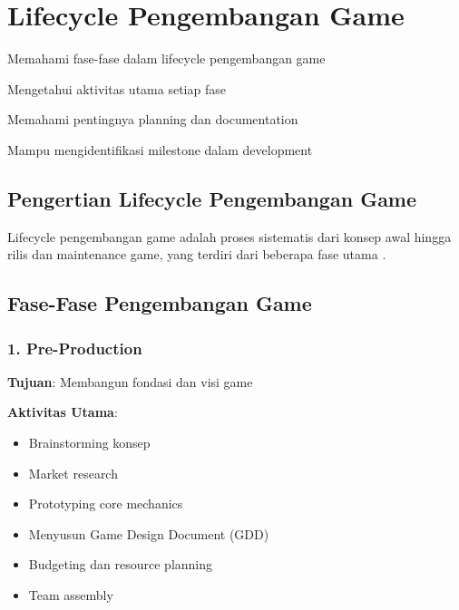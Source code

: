 
\section{Lifecycle Pengembangan Game}

\begin{learningoutcomes}
\item Memahami fase-fase dalam lifecycle pengembangan game
\item Mengetahui aktivitas utama setiap fase
\item Memahami pentingnya planning dan documentation
\item Mampu mengidentifikasi milestone dalam development
\end{learningoutcomes}

\subsection{Pengertian Lifecycle Pengembangan Game}

\begin{definisi}
Lifecycle pengembangan game adalah proses sistematis dari konsep awal hingga rilis dan maintenance game, yang terdiri dari beberapa fase utama \cite{Gregory2018}.
\end{definisi}

\subsection{Fase-Fase Pengembangan Game}

\subsubsection{1. Pre-Production}

\textbf{Tujuan}: Membangun fondasi dan visi game

\textbf{Aktivitas Utama}:
\begin{itemize}
\item Brainstorming konsep
\item Market research
\item Prototyping core mechanics
\item Menyusun Game Design Document (GDD)
\item Budgeting dan resource planning
\item Team assembly
\end{itemize}

